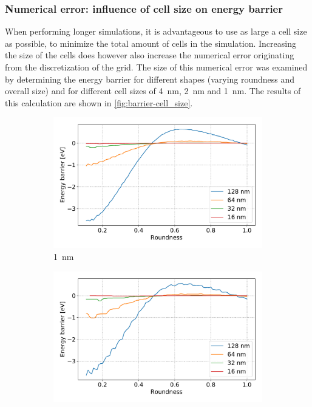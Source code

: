 \documentclass[10pt,a4paper]{article}
\begin{document}
\subsubsection{Numerical error: influence of cell size on energy barrier}
When performing longer simulations, it is advantageous to use as large a cell size as possible, to minimize the total amount of cells in the simulation. Increasing the size of the cells does however also increase the numerical error originating from the discretization of the grid. The size of this numerical error was examined by determining the energy barrier for different shapes (varying roundness and overall size) and for different cell sizes of \SI{4}{\nano\metre}, \SI{2}{\nano\metre} and \SI{1}{\nano\metre}. The results of this calculation are shown in \cref{fig:barrier-cell_size}.
\begin{figure}
     \centering
     \begin{subfigure}[b]{0.75\textwidth}
         \centering
         \includegraphics[width=\textwidth]{Figures/biaxial_island/Barrier/Plus_16-128_0.1-1_aPi4_B0.001_cell1nm.pdf}
         \caption{\SI{1}{\nano\metre}}
         \label{fig:barrier-cell_size-1nm}
     \end{subfigure}
     \hfill
     \begin{subfigure}[b]{0.75\textwidth}
         \centering
         \includegraphics[width=\textwidth]{Figures/biaxial_island/Barrier/Plus_16-128_0.1-1_aPi4_B0.001_cell2nm.pdf}

\end{subfigure}
\end{figure}
\end{document}
